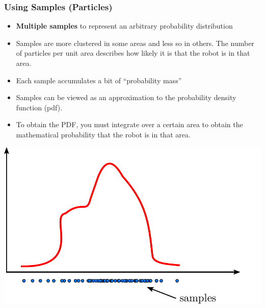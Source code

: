 \begin{frame}
    \frametitle{Using Samples (Particles)}
    \footnotesize
    \begin{itemize}
        \item \textbf{Multiple samples} to represent an arbitrary probability distribution
        \item Samples are more clustered in some areas and less so in others. The number of particles per unit area describes how likely it is that the robot is in that area.
        \item Each sample accumulates a bit of ``probability mass''
        \item Samples can be viewed as an approximation to the probability density function (pdf).
        \item To obtain the PDF, you must integrate over a certain area to obtain the mathematical probability that the robot is in that area.
    \end{itemize}
    
    \begin{center}
        \includegraphics[width=0.5\columnwidth]{./images/particle_filter/arbitrary_distribution_samples.pdf}
    \end{center}
    
\end{frame}
    
